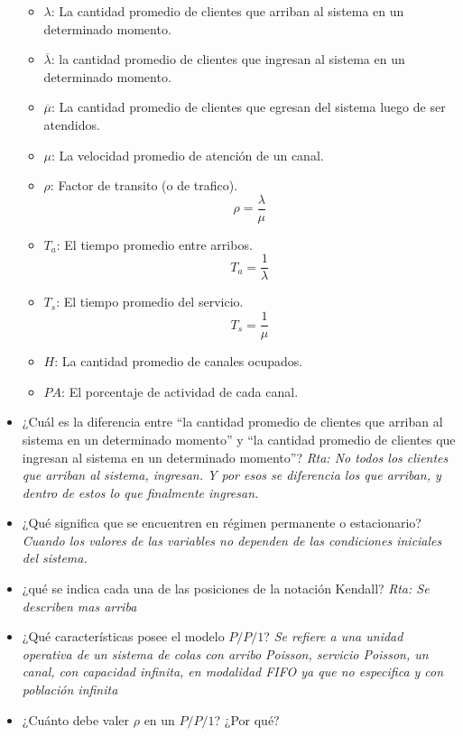 \documentclass{article}
\begin{document}
\begin{itemize}
\begin{itemize}
            \item \(\lambda\): La cantidad promedio de clientes que arriban al sistema en un determinado momento.
            \item $\overline{\lambda}$: la cantidad promedio de clientes que ingresan al sistema en un determinado momento.
            \item $\overline{\mu}$: La cantidad promedio de clientes que egresan del sistema luego de ser atendidos.
            \item \(\mu\): La velocidad promedio de atención de un canal.
            \item \(\rho\): Factor de transito (o de trafico).
                \begin{equation}
                    \rho = \frac{\lambda}{\mu}
                \end{equation}
            \item \(T_a\): El tiempo promedio entre arribos.
                \begin{equation}
                    T_a = \frac{1}{\lambda}
                \end{equation}
            \item \(T_s\): El tiempo promedio del servicio.
                \begin{equation}
                    T_s = \frac{1}{\mu}
                \end{equation}
            \item \(H\): La cantidad promedio de canales ocupados.
            \item \(PA\): El porcentaje de actividad de cada canal.
        \end{itemize}
    \item ¿Cuál es la diferencia entre “la cantidad promedio de clientes que arriban al sistema en un determinado momento” y “la cantidad promedio de clientes que ingresan al sistema en un determinado momento”?
        \newline\textit{Rta: No todos los clientes que arriban al sistema, ingresan. Y por esos se diferencia los que arriban, y dentro de estos lo que finalmente ingresan.}
    \item ¿Qué significa que se encuentren en régimen permanente o estacionario?
        \newline\textit{Cuando los valores de las variables no dependen de las condiciones iniciales del sistema.}       
    \item ¿qué se indica cada una de las posiciones de la notación Kendall?
        \newline\textit{Rta: Se describen mas arriba}
    \item ¿Qué características posee el modelo \(P/P/1\)?
        \newline\textit{Se refiere a una unidad operativa de un sistema de colas con arribo Poisson, servicio Poisson, un canal, con capacidad infinita, en modalidad FIFO ya que no especifica y con población infinita}
    \item ¿Cuánto debe valer \(\rho\) en un \(P/P/1\)? ¿Por qué?
        

\end{itemize}
\end{document}
